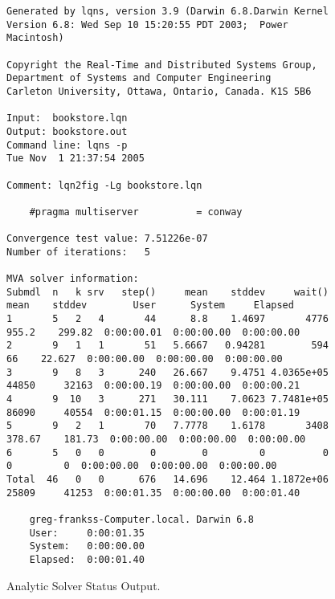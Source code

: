 \begin{sidewaysfigure}
  \centering
  \small
  \begin{verbatim}
Generated by lqns, version 3.9 (Darwin 6.8.Darwin Kernel Version 6.8: Wed Sep 10 15:20:55 PDT 2003;  Power Macintosh)

Copyright the Real-Time and Distributed Systems Group,
Department of Systems and Computer Engineering
Carleton University, Ottawa, Ontario, Canada. K1S 5B6

Input:  bookstore.lqn
Output: bookstore.out
Command line: lqns -p
Tue Nov  1 21:37:54 2005

Comment: lqn2fig -Lg bookstore.lqn

    #pragma multiserver          = conway

Convergence test value: 7.51226e-07
Number of iterations:   5

MVA solver information: 
Submdl  n   k srv   step()     mean    stddev     wait()     mean    stddev        User      System     Elapsed   
1       5   2   4       44      8.8    1.4697       4776    955.2    299.82  0:00:00.01  0:00:00.00  0:00:00.00 
2       9   1   1       51   5.6667   0.94281        594       66    22.627  0:00:00.00  0:00:00.00  0:00:00.00 
3       9   8   3      240   26.667    9.4751 4.0365e+05    44850     32163  0:00:00.19  0:00:00.00  0:00:00.21 
4       9  10   3      271   30.111    7.0623 7.7481e+05    86090     40554  0:00:01.15  0:00:00.00  0:00:01.19 
5       9   2   1       70   7.7778    1.6178       3408   378.67    181.73  0:00:00.00  0:00:00.00  0:00:00.00 
6       5   0   0        0        0         0          0        0         0  0:00:00.00  0:00:00.00  0:00:00.00 
Total  46   0   0      676   14.696    12.464 1.1872e+06    25809     41253  0:00:01.35  0:00:00.00  0:00:01.40 

    greg-frankss-Computer.local. Darwin 6.8
    User:     0:00:01.35
    System:   0:00:00.00
    Elapsed:  0:00:01.40
\end{verbatim}
  \caption{Analytic Solver Status Output.}
  \label{fig:output-lqns}
\end{sidewaysfigure}

